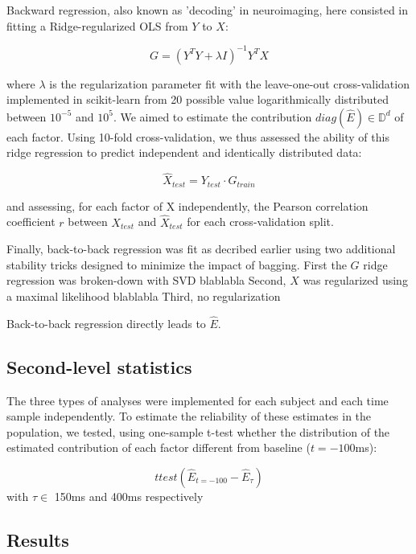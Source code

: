 Backward regression, also known as 'decoding' in neuroimaging, here consisted in fitting a Ridge-regularized OLS from $Y$ to $X$:

\begin{equation}
G = (Y^{T}Y+\lambda I)^{-1} Y^{T}X
\end{equation}

where $\lambda$ is the regularization parameter fit with the leave-one-out cross-validation
implemented in scikit-learn \cite{sklearn} from 20 possible value logarithmically distributed
between $10^{-5}$ and $10^5$. We aimed to estimate the contribution $diag(\hat E)
\in\mathbb{D}^{d} $ of each factor. Using 10-fold cross-validation, we thus assessed the ability
of this ridge regression to predict independent and identically distributed data:

\begin{equation}
\hat X_{test} = Y_{test}\cdot G_{train}
\end{equation}

and assessing, for each factor of X independently, the Pearson correlation coefficient $r$ between $X_{test}$ and $\hat X_{test}$ for each cross-validation split.

Finally, back-to-back regression was fit as decribed earlier using two additional stability tricks designed to minimize the impact of bagging.
First the $G$ ridge regression was broken-down with SVD blablabla
Second, $X$ was regularized using a maximal likelihood blablabla
Third, no regularization

Back-to-back regression directly leads to $\hat E$.


\subsection{Second-level statistics}

The three types of analyses were implemented for each subject and each time sample independently.
To estimate the reliability of these estimates in the population, we tested, using one-sample t-test whether the distribution of the estimated contribution of each factor different from baseline ($t=-100$ms):

\begin{equation}
ttest(\hat E_{t=-100} - \hat E_{\tau})
\end{equation}
with $\tau \in $ 150ms and 400ms respectively


\subsection{Results}


